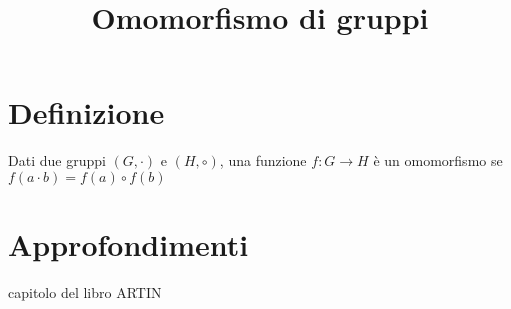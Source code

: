 \documentclass[a4paper,10pt]{article}
\title{Omomorfismo di gruppi}
\author{}
\begin{document}
\maketitle

\begin{abstract}

\end{abstract}

\section{Definizione}
Dati due gruppi $(G,\cdot)$ e $(H, \circ)$, una funzione $f:G \longrightarrow H$ è un omomorfismo se
$f(a \cdot b) = f(a) \circ f(b)$


\section{Approfondimenti}
capitolo del libro ARTIN
\end{document}
